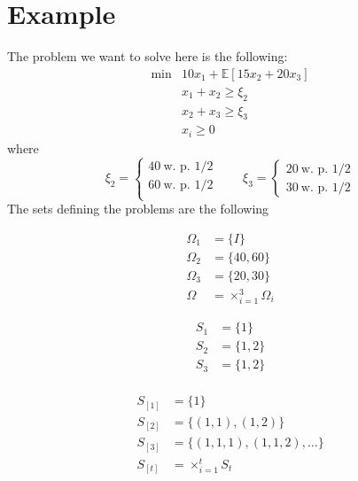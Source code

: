 \documentclass[12pt, openany]{report}
\newcommand{\E}{\mathbb{E}}
\theoremstyle{definition}
\begin{document}
\section{Example}\label{sec:example_nlds}
The problem we want to solve here is the following:
\begin{equation}
	\begin{aligned}
		\min &10x_1 + \E[15x_2+20x_3]\\
		& x_1+x_2\ge \xi_2\\
		& x_2+x_3\ge \xi_3\\
		& x_i \ge 0
	\end{aligned}
\end{equation}
where 
\begin{equation}
	\xi_2 = \begin{cases}
		40\ \text{w. p. } 1/2\\
		60\ \text{w. p. }1/2\\
	\end{cases}
	\qquad \xi_3 = \begin{cases}
		20\ \text{w. p. }1/2\\
		30\ \text{w. p. }1/2
	\end{cases}
\end{equation}
The sets defining the problems are the following\\
\begin{minipage}{.33\textwidth}
	\begin{equation}
		\begin{aligned}
			\Omega_1 &= \{I\}\\
			\Omega_2 &= \{40,60\}\\
			\Omega_3 &= \{20,30\}\\
			\Omega &= \times_{i=1}^3 \Omega_i
		\end{aligned}
	\end{equation}
\end{minipage}
\begin{minipage}{.33\textwidth}
	\begin{equation}
		\begin{aligned}
			S_1 &= \{1\}\\
			S_2 &= \{1,2\}\\
			S_3 &= \{1,2\}\\
		\end{aligned}
	\end{equation}
\end{minipage}
\begin{minipage}{.33\textwidth}
	\begin{equation}
		\begin{aligned}
			S_{[1]} &= \{1\}\\
			S_{[2]} &= \{(1,1), (1,2)\}\\
			S_{[3]} &= \{(1,1,1),(1,1,2), \dots\}\\
			S_{[t]} &= \times_{i=1}^t S_t
		\end{aligned}
	\end{equation}
\end{minipage}
\end{document}
